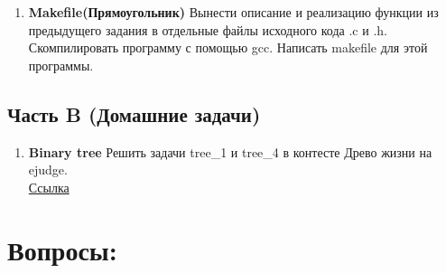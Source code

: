 \documentclass[12pt]{article}
\begin{document}
\begin{enumerate}
\item \textbf{Makefile(Прямоугольник)} Вынести описание и реализацию функции из предыдущего задания в отдельные файлы исходного кода .c и .h. Скомпилировать программу с помощью gcc. Написать makefile для этой программы.

\end{enumerate}

\subsection*{Часть B (Домашние задачи)}
\begin{enumerate}
\item \textbf{Binary tree} Решить задачи tree\_1 и tree\_4 в контесте Древо жизни на ejudge.\\
\href{http://93.175.29.68/cgi-bin/new-register?action=211&contest_id=500111}{Ссылка}
\end{enumerate}


\iffalse
\section*{Вопросы:}
\end{document}
